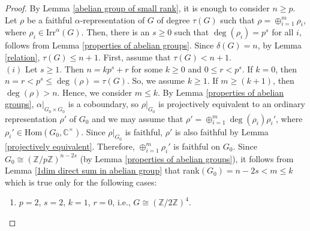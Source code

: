 \documentclass[a4paper,11pt]{amsart}
\numberwithin{equation}{section}
\numberwithin{equation}{subsection}
\newcommand{\Z}{\mathbb{Z}}
\newcommand{\poonam}[1]{{\color{blue} #1}}
\begin{document}
\begin{proof}
	By Lemma \ref{abelian group of small rank}, it is enough to consider $n \geq p$. Let $\rho$ be a faithful $\alpha$-representation of $G$ of degree $\tau(G)$ such that $\rho = \oplus_{i=1}^m\rho_i$, where $\rho_i \in \mathrm{Irr}^\alpha(G)$. Then, there is an $s \geq 0$ such that $\operatorname{deg}(\rho_i) = p^s$ for all $i$, follows from Lemma \ref{properties of abelian groups}. Since $\delta(G)= n$, by Lemma \ref{relation}, $\tau(G) \leq n+1$. First, assume that $\tau(G) < n+1$. \\
	
	$(i)$ Let $s \geq 1$. Then $n = kp^s+r$ for some $ k \geq 0$ and $0 \leq r < p^s$. If $k=0$, then $n=r <p^s \leq \operatorname{deg}(\rho)= \tau(G)$. So, we assume $k \ge 1$. If $m \geq (k+1)$, then $\operatorname{deg}(\rho) > n$. Hence, we consider $m \leq k$. 
	By Lemma \ref{properties of abelian groups}, $\alpha|_{G_0\times G_0}$ is a coboundary, so $\rho|_{G_0}$ is projectively equivalent to an ordinary representation $\rho'$ of $G_0$ and we may assume that $\rho' = \oplus_{i=1}^m \deg(\rho_i)\rho_i'$, where $\rho_i' \in \mathrm{Hom}(G_0, \mathbb C^\times)$. 
	Since $\rho|_{G_0}$ is faithful, $\rho'$ is also faithful by Lemma \ref{projectively equivalent}. Therefore, $\oplus_{i=1}^m \rho_i'$ is faithful on $G_0$. Since $G_0 \cong (\mathbb Z/p\Z)^{n-2s}$ (by Lemma \ref{properties of abelian groups}), it follows from Lemma \ref{1dim direct sum in abelian group} that rank$(G_0)=n-2s < m \leq k$ which is true only for the following cases: 
	\begin{enumerate}
		\item $p=2$, $s=2$, $k=1$, $r=0$, i.e., $G \cong (\Z/2\Z)^4$. %

\end{enumerate}
\end{proof}
\end{document}

